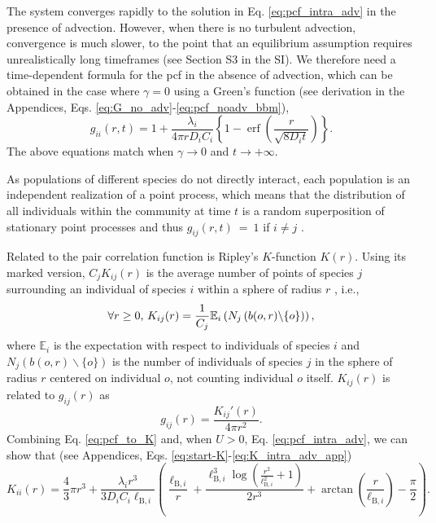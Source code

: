\documentclass[12pt,english]{article}
\DeclareMathOperator\erf{erf}
\newcommand{\ellB}{\ell_{\mathrm{B},i}}
\begin{document}
The system converges rapidly to the solution in Eq. \ref{eq:pcf_intra_adv}
in the presence of advection. However, when there is no turbulent
advection, convergence is much slower, to the point that an equilibrium
assumption requires unrealistically long timeframes (see Section S3
in the SI). We therefore need a time-dependent formula for the pcf
in the absence of advection, which can be obtained in the case where
$\gamma=0$ using a Green's function (see derivation in the Appendices,
Eqs. \ref{eq:G_no_adv}-\ref{eq:pcf_noadv_bbm}), 
\begin{equation}
g_{ii}(r,t)=1+\frac{\lambda_{i}}{4\pi rD_{i}C_{i}}\left\{ 1-\erf\left(\frac{r}{\sqrt{8D_{i}t}}\right)\right\} .\label{eq:pcf_intra_noadv}
\end{equation}
The above equations match when $\gamma\rightarrow0$ and $t\rightarrow+\infty$.

As populations of different species do not directly interact, each
population is an independent realization of a point process, which
means that the distribution of all individuals within the community
at time $t$ is a random superposition of stationary point processes
and thus $g_{ij}(r,t)~=~1$ if $i\neq j$ \citep[ p. 326, eq. 5.3.13]{illian2008statistical}.\medskip{}

Related to the pair correlation function is Ripley's $K$-function
$K(r)$. Using its marked version, $C_{j}K_{ij}(r)$ is the average
number of points of species $j$ surrounding an individual of species
$i$ within a sphere of radius $r$ \citep{illian2008statistical},
i.e., 
\begin{equation}
\forall r\geq0\textmd{, }K_{ij}(r)=\frac{1}{C_{j}}\mathbb{E}_{i}\left(N_{j}\left(b(o,r)\backslash\{o\}\right)\right),
\end{equation}
where $\mathbb{E}_{i}$ is the expectation with respect to individuals
of species $i$ and $N_{j}\left(b(o,r)\backslash\{o\}\right)$ is
the number of individuals of species $j$ in the sphere of radius
$r$ centered on individual $o$, not counting individual $o$ itself. $K_{ij}(r)$ is related to $g_{ij}(r)$ as 
\begin{equation}
g_{ij}(r)=\frac{K_{ij}'(r)}{4\pi r^{2}}.\label{eq:pcf_to_K}
\end{equation}
Combining Eq. \ref{eq:pcf_to_K} and, when $U>0$, Eq. \ref{eq:pcf_intra_adv},
we can show that (see Appendices, Eqs. \ref{eq:start-K}-\ref{eq:K_intra_adv_app})
\begin{equation}
K_{ii}(r)=\frac{4}{3}\pi r^{3}+\frac{\lambda_{i}r^{3}}{3D_{i}C_{i}\ellB}\left(\frac{\ellB}{r}+\frac{\ellB^{3}\log\left(\frac{r^{2}}{\ellB^{2}}+1\right)}{2r^{3}}+\arctan\left(\frac{r}{\ellB}\right)-\frac{\pi}{2}\right).\label{eq:K_intra_adv}
\end{equation}
\end{document}
